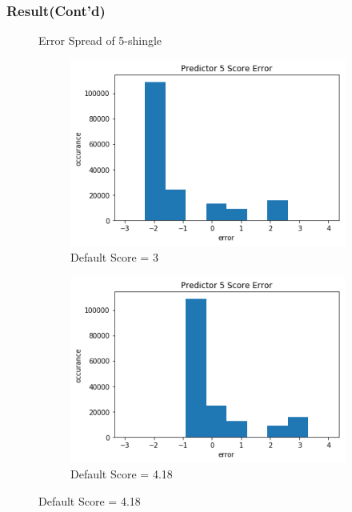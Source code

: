 \documentclass[11pt]{beamer}
\begin{document}
\begin{frame}
\frametitle{Result(Cont'd)}

\begin{figure}[h!]
  \centering
  Error Spread of 5-shingle\\
  \begin{subfigure}[b]{0.45\textwidth}
    \caption{Default Score = 3}
    \includegraphics[width=\linewidth]{predictor_5_error_3}
  \end{subfigure}
  \begin{subfigure}[b]{0.45\textwidth}
    \caption{Default Score = 4.18}
    \includegraphics[width=\linewidth]{predictor_5_error_train_mean}
  \end{subfigure}
\end{figure}

\end{frame}
\end{document}
